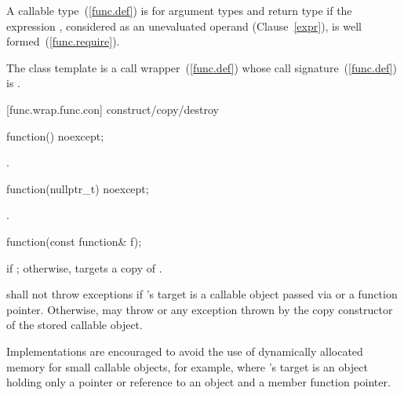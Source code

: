 \pnum
{}%
A callable type~(\ref{func.def}) 
is  for argument
types 
and return type 
if the expression
,
considered as an unevaluated operand (Clause~\ref{expr}), is
well formed~(\ref{func.require}).

\pnum
The  class template is a call
wrapper~(\ref{func.def}) whose call signature~(\ref{func.def})
is .

[func.wrap.func.con]{ construct/copy/destroy}

%
\begin{itemdecl}
function() noexcept;
\end{itemdecl}

\begin{itemdescr}
\pnum\postconditions {}.
\end{itemdescr}

%
\begin{itemdecl}
function(nullptr_t) noexcept;
\end{itemdecl}

\begin{itemdescr}
\pnum
\postconditions {}.
\end{itemdescr}

%
\begin{itemdecl}
function(const function& f);
\end{itemdecl}

\begin{itemdescr}
\pnum
\postconditions {} if ; otherwise,
 targets a copy of .

\pnum
\throws shall not throw exceptions if 's target is
a callable object passed via  or
a function pointer. Otherwise, may throw 
or any exception thrown by the copy constructor of the stored callable object.
\begin{note} Implementations are encouraged to avoid the use of
dynamically allocated memory for small callable objects, for example, where
's target is an object holding only a pointer or reference
to an object and a member function pointer. \end{note}
\end{itemdescr}

